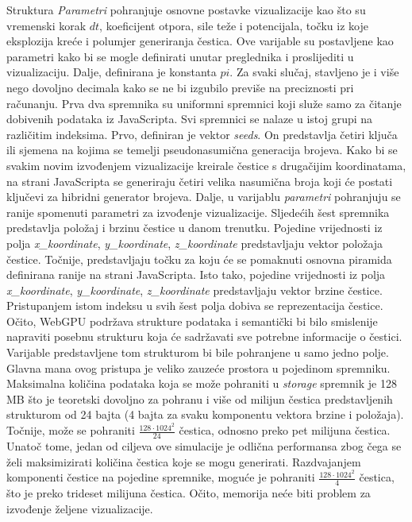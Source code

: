 \documentclass{foi}
\begin{document}
Struktura \textit{Parametri} pohranjuje osnovne postavke vizualizacije kao što su vremenski korak $dt$, koeficijent otpora, sile teže i potencijala, točku iz koje eksplozija kreće i polumjer generiranja čestica. Ove varijable su postavljene kao parametri kako bi se mogle definirati unutar preglednika i proslijediti u vizualizaciju. Dalje, definirana je konstanta $pi$. Za svaki slučaj, stavljeno je i više nego dovoljno decimala kako se ne bi izgubilo previše na preciznosti pri računanju. Prva dva spremnika su uniformni spremnici koji služe samo za čitanje dobivenih podataka iz JavaScripta. Svi spremnici se nalaze u istoj grupi na različitim indeksima. Prvo, definiran je vektor \textit{seeds}. On predstavlja četiri ključa ili sjemena na kojima se temelji pseudonasumična generacija brojeva. Kako bi se svakim novim izvođenjem vizualizacije kreirale čestice s drugačijim koordinatama, na strani JavaScripta se generiraju četiri velika nasumična broja koji će postati ključevi za hibridni generator brojeva. Dalje, u varijablu \textit{parametri} pohranjuju se ranije spomenuti parametri za izvođenje vizualizacije. Sljedećih šest spremnika predstavlja položaj i brzinu čestice u danom trenutku. Pojedine vrijednosti iz polja \textit{x\_koordinate}, \textit{y\_koordinate}, \textit{z\_koordinate} predstavljaju vektor položaja čestice. Točnije, predstavljaju točku za koju će se pomaknuti osnovna piramida definirana ranije na strani JavaScripta. Isto tako, pojedine vrijednosti iz polja \textit{x\_koordinate}, \textit{y\_koordinate}, \textit{z\_koordinate} predstavljaju vektor brzine čestice. Pristupanjem istom indeksu u svih šest polja dobiva se reprezentacija čestice. Očito, WebGPU podržava strukture podataka i semantički bi bilo smislenije napraviti posebnu strukturu koja će sadržavati sve potrebne informacije o čestici. Varijable predstavljene tom strukturom bi bile pohranjene u samo jedno polje. Glavna mana ovog pristupa je veliko zauzeće prostora u pojedinom spremniku. Maksimalna količina podataka koja se može pohraniti u \textit{storage} spremnik je 128 MB što je teoretski dovoljno za pohranu i više od milijun čestica predstavljenih strukturom od 24 bajta (4 bajta za svaku komponentu vektora brzine i položaja). Točnije, može se pohraniti $\frac{128\cdot 1024^2}{24}$ čestica, odnosno preko pet milijuna čestica. Unatoč tome, jedan od ciljeva ove simulacije je odlična performansa zbog čega se želi maksimizirati količina čestica koje se mogu generirati. Razdvajanjem komponenti čestice na pojedine spremnike, moguće je pohraniti $\frac{128\cdot 1024^2}{4}$ čestica, što je preko trideset milijuna čestica. Očito, memorija neće biti problem za izvođenje željene vizualizacije.
\end{document}
